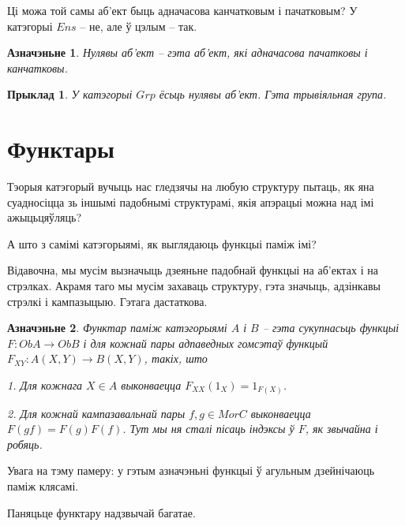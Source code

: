 \documentclass[a4paper,12pt]{book}
\newtheorem{example}{Прыклад}[section]
\newtheorem{definition}{Азначэньне}[section]
\begin{document}
Ці можа той самы аб'ект быць адначасова канчатковым і пачатковым? У
катэгорыі $Ens$ -- не, але ў цэлым -- так.

\begin{definition}
  Нулявы аб'ект -- гэта аб'ект, які адначасова пачатковы і канчатковы.
\end{definition}

\begin{example}
  У катэгорыі $Grp$ ёсьць нулявы аб'ект. Гэта трывіяльная група.
\end{example}

\section{Функтары}

Тэорыя катэгорый вучыць нас гледзячы на любую структуру пытаць, як яна
суадносіцца зь іншымі падобнымі структурамі, якія апэрацыі можна над
імі ажыцьцяўляць?

А што з самімі катэгорыямі, як выглядаюць функцыі паміж імі?

Відавочна, мы мусім вызначыць дзеяньне падобнай функцыі на аб'ектах і
на стрэлках. Акрамя таго мы мусім захаваць структуру, гэта значыць,
адзінкавы стрэлкі і кампазыцыю. Гэтага дастаткова.

\begin{definition}
  Функтар паміж катэгорыямі $A$ і $B$ -- гэта сукупнасьць функцыі
  $F:Ob A \rightarrow Ob B$ і для кожнай пары адпаведных гомсэтаў
  функцый $F_{XY}: A(X, Y) \rightarrow B(X, Y)$, такіх, што

  1. Для кожнага $X \in A$ выконваецца $F_{XX}(1_X) = 1_{F(X)}$.

  2. Для кожнай кампазавальнай пары $f, g \in Mor C$ выконваецца
  $F(gf) = F(g)F(f)$. Тут мы ня сталі пісаць індэксы ў $F$, як
  звычайна і робяць.
\end{definition}

Увага на тэму памеру: у гэтым азначэньні функцыі ў агульным
дзейнічаюць паміж клясамі.

Паняцьце функтару надзвычай багатае.
\end{document}
